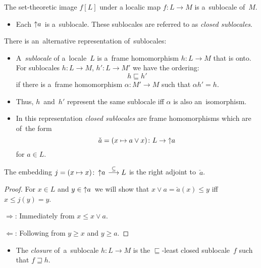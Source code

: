 \begin{fact}
  The set-theoretic image $f[L]$ under a localic map $f\colon L\to M$
  is a~sublocale of~$M$.
\end{fact}

\begin{itemize}
\item Each $\left\uparrow a\right.$ is a~sublocale.
These sublocales are referred to as \emph{closed sublocales\/}.
\end{itemize}

\begin{rem}
  There is an~alternative representation of~sublocales:
  \begin{itemize}
    \item A~\emph{sublocale\/} of a~locale~$L$ is a~frame homomorphism $h\colon
    L \to M$ that is onto.
    For sublocales $h\colon L \to M$, $h'\colon L \to M'$ we have the ordering:
    \[
      h \sqsubseteq h'
    \]
    if there is a~frame homomorphism $\alpha\colon M' \to M$ such that $\alpha
    h' = h$.

    \item Thus, $h$~and~$h'$ represent the same sublocale iff $\alpha$ is also
    an~isomorphism.

    \item
    \label{df:closed-sloc}
    In this representation \emph{closed sublocales\/} are frame homomorphisms
    which are of~the form
    \[
      \check{a} = (x \mapsto a \vee x) \colon L \to \left\uparrow a \right.
    \]
    for $a\in L$.
  \end{itemize}
\end{rem}

\begin{lem} \label{lem:embed-adjoint}
  The embedding $j = (x \mapsto x)\colon \left\uparrow a \right. \embed L$ is
  the right adjoint to~$\check{a}$.
\end{lem}
\begin{proof}
  For $x\in L$ and $y\in \left\uparrow a \right.$ we will show that $x \vee a =
  \check{a}(x) \le y$ iff $x \le j(y) = y$.

  $\Rightarrow$:
  Immediately from $x \le x \vee a$.

  $\Leftarrow$:
  Following from $y \ge x$ and $y \ge a$.
\end{proof}

\begin{itemize}
  \item The \emph{closure\/} of~a~sublocale $h\colon L \to M$ is the
  $\sqsubseteq$-least closed sublocale~$f$ such that $f \sqsupseteq h$.
\end{itemize}

